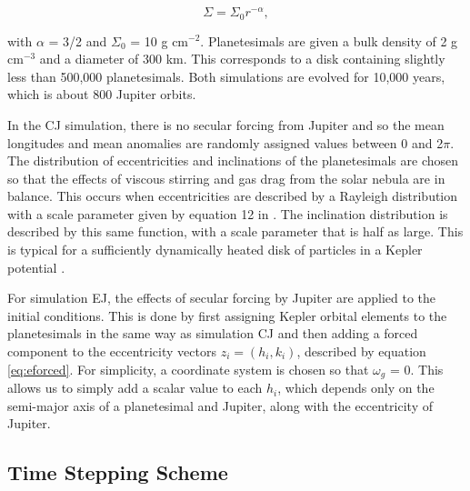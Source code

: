 \documentclass[twocolumn]{aastex63}
\begin{document}
\begin{equation}\label{eq:surf_den}
	\Sigma = \Sigma_{0} r^{-\alpha},
\end{equation}

\noindent with $\alpha$ = 3/2 and $\Sigma_{0}$ = 10 g cm$^{-2}$. Planetesimals are given a bulk density of 2 g cm$^{-3}$ and a diameter of 300 km. This corresponds to a disk containing slightly less than 500,000 planetesimals. Both simulations are evolved for 10,000 years, which is about 800 Jupiter orbits.

In the CJ simulation, there is no secular forcing from Jupiter and so the mean longitudes and mean anomalies are randomly assigned values between 0 and 2$\pi$. The distribution of eccentricities and inclinations of the planetesimals are chosen so that the effects of viscous stirring and gas drag from the solar nebula are in balance. This occurs when eccentricities are described by a Rayleigh distribution with a scale parameter given by equation 12 in \citet{2002ApJ...581..666K}. The inclination distribution is described by this same function, with a scale parameter that is half as large. This is typical for a sufficiently dynamically heated disk of particles in a Kepler potential \citep{1993MNRAS.263..875I}.

For simulation EJ, the effects of secular forcing by Jupiter are applied to the initial conditions. This is done by first assigning Kepler orbital elements to the planetesimals in the same way as simulation CJ and then adding a forced component to the eccentricity vectors $z_{i} = \left( h_{i}, k_{i} \right)$, described by equation \ref{eq:eforced}. For simplicity, a coordinate system is chosen so that $\omega_{g}$ = 0. This allows us to simply add a scalar value to each $h_{i}$, which depends only on the semi-major axis of a planetesimal and Jupiter, along with the eccentricity of Jupiter.

\subsection{Time Stepping Scheme}\label{sec:timestep}
\end{document}
